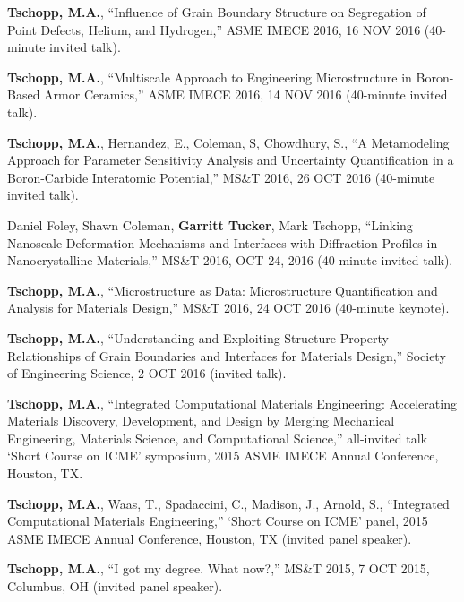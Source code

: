 \begin{cvlist}
\item
\textbf{Tschopp, M.A.}, ``Influence of Grain Boundary Structure on Segregation of Point Defects, Helium, and Hydrogen,'' ASME IMECE 2016, 16 NOV 2016 (40-minute invited talk).

\item
\textbf{Tschopp, M.A.}, ``Multiscale Approach to Engineering Microstructure in Boron-Based Armor Ceramics,'' ASME IMECE 2016, 14 NOV 2016 (40-minute invited talk).

\item
\textbf{Tschopp, M.A.}, Hernandez, E., Coleman, S, Chowdhury, S., ``A Metamodeling Approach for Parameter Sensitivity Analysis and Uncertainty Quantification in a Boron-Carbide Interatomic Potential,'' MS\&T 2016, 26 OCT 2016 (40-minute invited talk).

\item
Daniel Foley, Shawn Coleman, \textbf{Garritt Tucker}, Mark Tschopp,  ``Linking Nanoscale Deformation Mechanisms and Interfaces with Diffraction Profiles in Nanocrystalline Materials,'' MS\&T 2016, OCT 24, 2016 (40-minute invited talk).

\item
\textbf{Tschopp, M.A.}, ``Microstructure as Data: Microstructure Quantification and Analysis for Materials Design,'' MS\&T 2016, 24 OCT 2016 (40-minute keynote).

\item
\textbf{Tschopp, M.A.}, ``Understanding and Exploiting Structure-Property Relationships of Grain Boundaries and Interfaces for Materials Design,'' Society of Engineering Science, 2 OCT 2016 (invited talk).

\item
\textbf{Tschopp, M.A.}, ``Integrated Computational Materials Engineering: Accelerating Materials Discovery, Development, and Design by Merging Mechanical Engineering, Materials Science, and Computational Science,'' all-invited talk `Short Course on ICME' symposium, 2015 ASME IMECE Annual Conference, Houston, TX.

\item
\textbf{Tschopp, M.A.}, Waas, T., Spadaccini, C., Madison, J., Arnold, S., ``Integrated Computational Materials Engineering,'' `Short Course on ICME' panel, 2015 ASME IMECE Annual Conference, Houston, TX (invited panel speaker).

\item
\textbf{Tschopp, M.A.}, ``I got my degree. What now?,'' MS\&T 2015, 7 OCT 2015, Columbus, OH (invited panel speaker).


\end{cvlist}
